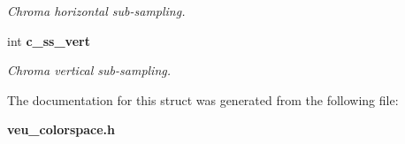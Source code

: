 \begin{DoxyCompactItemize}
\begin{DoxyCompactList}\small\item\em Chroma horizontal sub-\/sampling. \item\end{DoxyCompactList}\item 
int {\bf c\_\-ss\_\-vert}\label{structformat__info_a307174605617c7d70af459f1d1df8db8}

\begin{DoxyCompactList}\small\item\em Chroma vertical sub-\/sampling. \item\end{DoxyCompactList}\end{DoxyCompactItemize}


The documentation for this struct was generated from the following file:\begin{DoxyCompactItemize}
\item 
{\bf veu\_\-colorspace.h}\end{DoxyCompactItemize}

